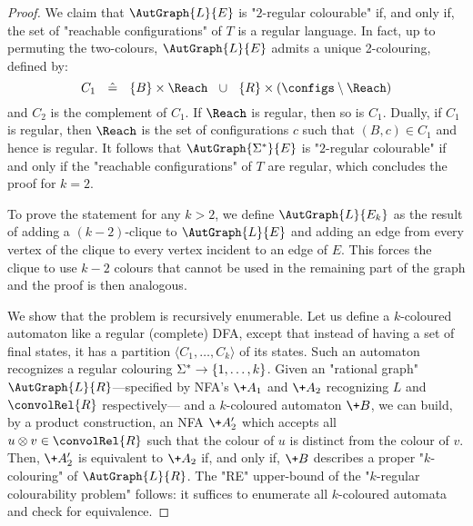 \begin{proof}
    We claim that $\AutGraph{L}{E}$ is "$2$-regular colourable" if, and only if, the set of "reachable configurations" of $T$ is a regular language. 
    In fact, up to permuting the two-colours, 
  $\AutGraph{L}{E}$ admits a unique 2-colouring, defined by:
    \[
        C_1 ~~ \defeq ~~ \{B\} \times \Reach ~~\cup~~ \{R\} \times (\configs \setminus \Reach)
    \]
    and $C_2$ is the complement of $C_1$.
    If $\Reach$ is regular, then so is $C_1$. Dually, if $C_1$ is regular, then
    $\Reach$ is the set of configurations $c$ such that $(B,c) \in C_1$ and hence is regular.
    It follows that $\AutGraph{\Sigma^*}{E}$ is "$2$-regular colourable" if and only if
    the "reachable configurations" of $T$ are regular, which concludes the proof for $k=2$.



    To prove the statement for any $k>2$, we define $\AutGraph{L}{E_k}$ as the result of adding a $(k-2)$-clique to $\AutGraph{L}{E}$ and adding an edge from every vertex of the clique to every vertex incident to an edge of $E$. This forces the clique to use $k-2$ colours that cannot be used in the remaining part of the graph and the proof is then analogous.

	 We show that the problem is recursively enumerable. Let us define a $k$-coloured automaton like a regular (complete) DFA, except that instead of having
	a set of final states, it has a partition $\langle C_1,\hdots,C_k \rangle$ of its states.
	Such an automaton recognizes a regular colouring $\Sigma^* \to \{1, \dotsc, k\}$.
	Given an "rational graph" $\AutGraph{L}{R}$---specified by
	 NFA's $\+A_1$ and $\+A_2$ recognizing $L$ and $\convolRel{R}$  respectively--- and a $k$-coloured automaton $\+B$,
	we can build, by a product construction, an NFA $\+A'_2$  which accepts
	all $u \otimes v \in \convolRel{R}$ such that the colour of $u$ is distinct from the colour of $v$.
	Then, $\+A'_2$ is equivalent to $\+A_2$ if, and only if, $\+B$ describes a proper "$k$-colouring" 
	of $\AutGraph{L}{R}$. The "RE" upper-bound of the "$k$-regular colourability problem" follows: it 
	suffices to enumerate all $k$-coloured automata and check for equivalence.
\end{proof}

